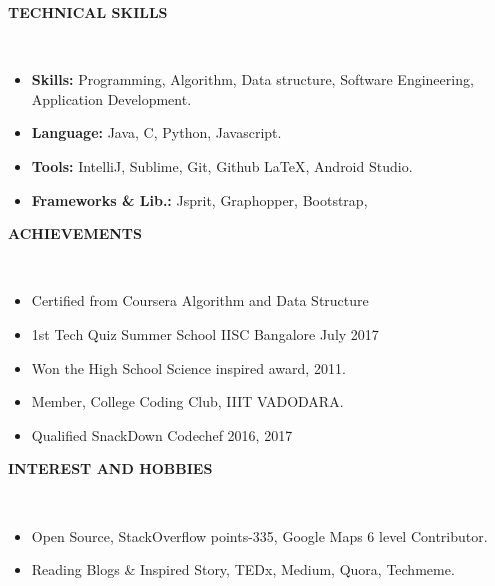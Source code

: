 \documentclass[a4paper,10pt]{article}
\newcommand{\lsep}{-0.5cm}
\newcommand{\resheading}[1]{{\small \colorbox{mygrey}{\begin{minipage}{0.975\textwidth}{\textbf{#1 \vphantom{p\^{E}}}}\end{minipage}}}}
\begin{document}
\resheading{\textbf{TECHNICAL SKILLS} }\\[\lsep]
\begin{itemize} \itemsep-0.2em
\item \textbf{Skills:} Programming, Algorithm, Data structure, Software Engineering, Application Development.
\item \textbf{Language:} Java, C, Python, Javascript.
\item \textbf{Tools:} IntelliJ, Sublime, Git, Github \LaTeX, Android Studio.
\item \textbf{Frameworks \& Lib.:} Jsprit, Graphopper, Bootstrap,
\end{itemize}
\newpage
\resheading{\textbf{ACHIEVEMENTS} }\\[\lsep]
\begin{itemize}
\itemsep-0.2em
\item Certified from Coursera Algorithm and Data Structure  
\item 1st Tech Quiz Summer School IISC Bangalore July 2017 
\item Won the High School Science inspired award, 2011. 
\item Member, College Coding Club, IIIT VADODARA. 
\item Qualified SnackDown Codechef 2016, 2017 
\end{itemize}

\resheading{\textbf{INTEREST AND HOBBIES} }\\[\lsep]
\begin{itemize}
\itemsep-0.2em
\item Open Source, StackOverflow points-335, Google Maps 6 level Contributor.
\item Reading Blogs \& Inspired Story, TEDx, Medium, Quora,  Techmeme.
\end{itemize}
\end{document}
